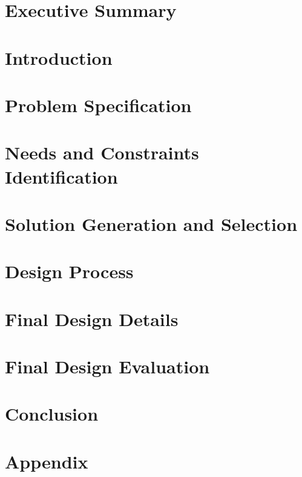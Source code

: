 \documentclass{article}
\begin{document}
\section*{Executive Summary}

\clearpage

\section{Introduction} \label{introduction}

\clearpage

\section{Problem Specification} \label{Problem_Specification}

\clearpage

\section{Needs and Constraints Identification} \label{Needs}

\clearpage

\section{Solution Generation and Selection} \label{Solution_Generation}

\clearpage

\section{Design Process} \label{Design}

\clearpage

\section{Final Design Details} \label{Design_Details}

\clearpage

\section{Final Design Evaluation} \label{Evaluation}

\clearpage

\section{Conclusion}

\clearpage

 \label{Appendix}
\section*{Appendix}


 \label{References}
\printbibliography
\end{document}
